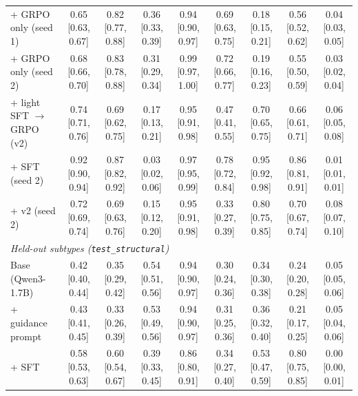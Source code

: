 \begin{tabular}{lcccccccc}
+ GRPO only (seed 1) & 0.65 {\scriptsize [0.63, 0.67]} & 0.82 {\scriptsize [0.77, 0.88]} & 0.36 {\scriptsize [0.33, 0.39]} & 0.94 {\scriptsize [0.90, 0.97]} & 0.69 {\scriptsize [0.63, 0.75]} & 0.18 {\scriptsize [0.15, 0.21]} & 0.56 {\scriptsize [0.52, 0.62]} & 0.04 {\scriptsize [0.03, 0.05]} \\
+ GRPO only (seed 2) & 0.68 {\scriptsize [0.66, 0.70]} & 0.83 {\scriptsize [0.78, 0.88]} & 0.31 {\scriptsize [0.29, 0.34]} & 0.99 {\scriptsize [0.97, 1.00]} & 0.72 {\scriptsize [0.66, 0.77]} & 0.19 {\scriptsize [0.16, 0.23]} & 0.55 {\scriptsize [0.50, 0.59]} & 0.03 {\scriptsize [0.02, 0.04]} \\
+ light SFT $\to$ GRPO (v2) & 0.74 {\scriptsize [0.71, 0.76]} & 0.69 {\scriptsize [0.62, 0.75]} & 0.17 {\scriptsize [0.13, 0.21]} & 0.95 {\scriptsize [0.91, 0.98]} & 0.47 {\scriptsize [0.41, 0.55]} & 0.70 {\scriptsize [0.65, 0.75]} & 0.66 {\scriptsize [0.61, 0.71]} & 0.06 {\scriptsize [0.05, 0.08]} \\
+ SFT (seed 2) & 0.92 {\scriptsize [0.90, 0.94]} & 0.87 {\scriptsize [0.82, 0.92]} & 0.03 {\scriptsize [0.02, 0.06]} & 0.97 {\scriptsize [0.95, 0.99]} & 0.78 {\scriptsize [0.72, 0.84]} & 0.95 {\scriptsize [0.92, 0.98]} & 0.86 {\scriptsize [0.81, 0.91]} & 0.01 {\scriptsize [0.01, 0.01]} \\
+ v2 (seed 2) & 0.72 {\scriptsize [0.69, 0.74]} & 0.69 {\scriptsize [0.63, 0.76]} & 0.15 {\scriptsize [0.12, 0.20]} & 0.95 {\scriptsize [0.91, 0.98]} & 0.33 {\scriptsize [0.27, 0.39]} & 0.80 {\scriptsize [0.75, 0.85]} & 0.70 {\scriptsize [0.67, 0.74]} & 0.08 {\scriptsize [0.07, 0.10]} \\
\midrule
\multicolumn{9}{l}{\textit{Held-out subtypes (\texttt{test\_structural})}} \\
\midrule
Base (Qwen3-1.7B) & 0.42 {\scriptsize [0.40, 0.44]} & 0.35 {\scriptsize [0.29, 0.42]} & 0.54 {\scriptsize [0.51, 0.56]} & 0.94 {\scriptsize [0.90, 0.97]} & 0.30 {\scriptsize [0.24, 0.36]} & 0.34 {\scriptsize [0.30, 0.38]} & 0.24 {\scriptsize [0.20, 0.28]} & 0.05 {\scriptsize [0.05, 0.06]} \\
+ guidance prompt & 0.43 {\scriptsize [0.41, 0.45]} & 0.33 {\scriptsize [0.26, 0.39]} & 0.53 {\scriptsize [0.49, 0.56]} & 0.94 {\scriptsize [0.90, 0.97]} & 0.31 {\scriptsize [0.25, 0.36]} & 0.36 {\scriptsize [0.32, 0.40]} & 0.21 {\scriptsize [0.17, 0.25]} & 0.05 {\scriptsize [0.04, 0.06]} \\
+ SFT & 0.58 {\scriptsize [0.53, 0.63]} & 0.60 {\scriptsize [0.54, 0.67]} & 0.39 {\scriptsize [0.33, 0.45]} & 0.86 {\scriptsize [0.80, 0.91]} & 0.34 {\scriptsize [0.27, 0.40]} & 0.53 {\scriptsize [0.47, 0.59]} & 0.80 {\scriptsize [0.75, 0.85]} & 0.00 {\scriptsize [0.00, 0.01]} \\

\end{tabular}
